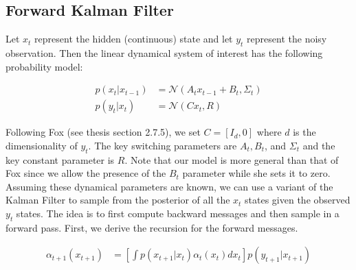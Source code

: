 \documentclass{article} %
\begin{document}
\subsection{Forward Kalman Filter}
Let $x_t$ represent the hidden (continuous) state and let $y_t$ represent the noisy observation. Then the linear dynamical system of interest has the following probability model:

\begin{align*}
p(x_t|x_{t-1}) &= \mathcal{N}(A_t x_{t-1}+B_t,\Sigma_t)\\
p(y_t|x_t) &= \mathcal{N}(C x_t,R)
\end{align*}

Following Fox (see thesis section 2.7.5), we set $C = [I_d,0]$ where $d$ is the dimensionality of $y_t$. The key switching parameters are $A_t, B_t$, and $\Sigma_t$ and the key constant parameter is $R$. Note that our model is more general than that of Fox since we allow the presence of the $B_t$ parameter while she sets it to zero. Assuming these dynamical parameters are known, we can use a variant of the Kalman Filter to sample from the posterior of all the $x_t$ states given the observed $y_t$ states. The idea is to first compute backward messages and then sample in a forward pass. First, we derive the recursion for the forward messages.

\begin{align*}
\alpha_{t+1}(x_{t+1}) &= \left[\int p(x_{t+1}|x_t)\alpha_t(x_t)dx_t\right] p(y_{t+1}|x_{t+1})
\end{align*}
\end{document}
